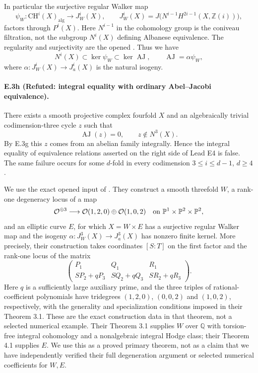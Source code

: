 In particular the surjective regular Walker map
\[
 \psi_W:\mathrm{CH}^i(X)_{\mathrm{alg}}\longrightarrow J_W^i(X),
 \qquad
 J_W^i(X)=J\bigl(N^{i-1}H^{2i-1}(X,\mathbb Z(i))\bigr),
\]
factors through $P^i(X)$. Here $N^{i-1}$ in the cohomology group
is the coniveau filtration, not the subgroup $N^i(X)$ defining
Albanese equivalence. The regularity and surjectivity are the
opened \citet[Theorem 1.1, pp.~2--3; Corollaries 2.5--2.6,
pp.~7--8]{cySuzuki2021}. Thus we have
\[
 N^i(X)\subset\ker\psi_W\subset\ker\operatorname{AJ},
 \qquad
 \operatorname{AJ}=\alpha\psi_W,
\]
where $\alpha:J_W^i(X)\to J_a^i(X)$ is the natural isogeny.

\paragraph{E.3h (Refuted: integral equality with ordinary Abel--Jacobi equivalence).}
There exists a smooth projective complex fourfold $X$ and an
algebraically trivial codimension-three cycle $z$ such that
\[
 \operatorname{AJ}(z)=0,
 \qquad z\notin N^3(X).
\]
By E.3g this $z$ comes from an abelian family integrally. Hence the
integral equality of equivalence relations asserted on the right
side of Lead E4 is false. The same failure occurs for some
$d$-fold in every codimension $3\le i\le d-1$, $d\ge4$.

We use the exact opened input of
\citet[Corollary 4.2 and Remark 4.3, author p.~10]{cyOttemSuzuki2020}.
They construct a smooth threefold $W$, a rank-one degeneracy locus
of a map
\[
 \mathcal O^{\oplus3}\longrightarrow
 \mathcal O(1,2,0)\oplus\mathcal O(1,0,2)
 \quad\hbox{on }\mathbb P^1\times\mathbb P^2\times\mathbb P^2,
\]
and an elliptic curve $E$, for which $X=W\times E$ has a
surjective regular Walker map and the isogeny
$\alpha:J_W^3(X)\to J_a^3(X)$ has nonzero finite kernel.
More precisely, their construction takes coordinates $[S:T]$
on the first factor and the rank-one locus of the matrix
\[
 \begin{pmatrix}
 P_1&Q_1&R_1\\
 SP_2+qP_3&SQ_2+qQ_3&SR_2+qR_3
 \end{pmatrix}.
\]
Here $q$ is a sufficiently large auxiliary prime, and the three
triples of rational-coefficient polynomials have tridegrees
$(1,2,0)$, $(0,0,2)$ and $(1,0,2)$, respectively, with the
generality and specialization conditions imposed in their
Theorem 3.1. These are the exact construction data in that
theorem, not a selected numerical example.
Their Theorem 3.1 supplies $W$ over $\mathbb Q$ with torsion-free
integral cohomology and a nonalgebraic integral Hodge class; their
Theorem 4.1 supplies $E$. We use this as a proved primary theorem,
not as a claim that we have independently verified their full
degeneration argument or selected numerical coefficients for $W,E$.

